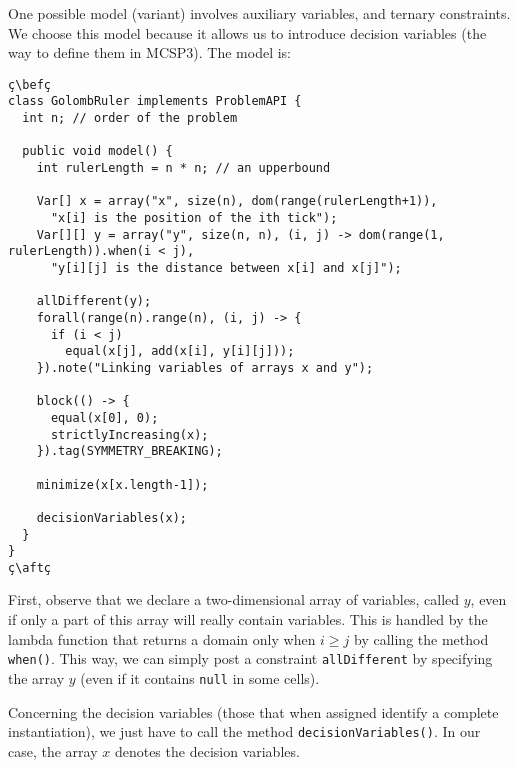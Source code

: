\documentclass[10pt]{article}
\newcommand{\gb}[1]{{\tt #1}} %
\newcommand{\nn}[1]{{\tt #1}} %
\def\bef{\rule{10cm}{0.1mm}} %
\def\aft{\rule{10cm}{0.1mm}\medskip}
\begin{document}
One possible model (variant) involves auxiliary variables, and ternary constraints.
We choose this model because it allows us to introduce decision variables (the way to define them in MCSP3).
The model is:

\begin{lstlisting}
ç\befç
class GolombRuler implements ProblemAPI {
  int n; // order of the problem

  public void model() {
    int rulerLength = n * n; // an upperbound

    Var[] x = array("x", size(n), dom(range(rulerLength+1)),
      "x[i] is the position of the ith tick");
    Var[][] y = array("y", size(n, n), (i, j) -> dom(range(1, rulerLength)).when(i < j),
      "y[i][j] is the distance between x[i] and x[j]");
      
    allDifferent(y);
    forall(range(n).range(n), (i, j) -> {
      if (i < j)
        equal(x[j], add(x[i], y[i][j]));
    }).note("Linking variables of arrays x and y");
      
    block(() -> {
      equal(x[0], 0);
      strictlyIncreasing(x);
    }).tag(SYMMETRY_BREAKING);
    
    minimize(x[x.length-1]);

    decisionVariables(x);
  }
}
ç\aftç
\end{lstlisting}

First, observe that we declare a two-dimensional array of variables, called $y$, even if only a part of this array will really contain variables.
This is handled by the lambda function that returns a domain only when $ i \geq j$ by calling the method \nn{when()}.
This way, we can simply post a constraint \gb{allDifferent} by specifying the array $y$ (even if it contains \texttt{null} in some cells).

Concerning the decision variables (those that when assigned identify a complete instantiation), we just have to call the method \nn{decisionVariables()}.
In our case, the array $x$ denotes the decision variables.
\end{document}
